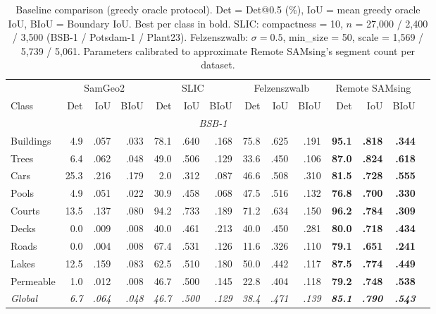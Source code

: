 \documentclass[review,11pt,authoryear]{elsarticle}
\begin{document}
\begin{table}[htbp]
\centering
\caption{Baseline comparison (greedy oracle protocol). Det = Det@0.5 (\%), IoU = mean greedy oracle IoU, BIoU = Boundary IoU. Best per class in bold. SLIC: compactness = 10, $n$ = 27{,}000 / 2{,}400 / 3{,}500 (BSB-1 / Potsdam-1 / Plant23). Felzenszwalb: $\sigma = 0.5$, min\_size = 50, scale = 1{,}569 / 5{,}739 / 5{,}061. Parameters calibrated to approximate Remote SAMsing's segment count per dataset.}
\label{tab:baselines}
\scriptsize
\begin{tabular*}{\textwidth}{@{\extracolsep{\fill}}lrrrrrrrrrrrrr}
\toprule
 & \multicolumn{3}{c}{SamGeo2} & \multicolumn{3}{c}{SLIC} & \multicolumn{3}{c}{Felzenszwalb} & \multicolumn{3}{c}{Remote SAMsing} \\
\cmidrule(lr){2-4} \cmidrule(lr){5-7} \cmidrule(lr){8-10} \cmidrule(lr){11-13}
Class & Det & IoU & BIoU & Det & IoU & BIoU & Det & IoU & BIoU & Det & IoU & BIoU \\
\midrule
\multicolumn{13}{c}{\footnotesize\textit{BSB-1}} \\
\midrule
Buildings &  4.9 & .057 & .033 & 78.1 & .640 & .168 & 75.8 & .625 & .191 & \textbf{95.1} & \textbf{.818} & \textbf{.344} \\
Trees     &  6.4 & .062 & .048 & 49.0 & .506 & .129 & 33.6 & .450 & .106 & \textbf{87.0} & \textbf{.824} & \textbf{.618} \\
Cars      & 25.3 & .216 & .179 &  2.0 & .312 & .087 & 46.6 & .508 & .310 & \textbf{81.5} & \textbf{.728} & \textbf{.555} \\
Pools     &  4.9 & .051 & .022 & 30.9 & .458 & .068 & 47.5 & .516 & .132 & \textbf{76.8} & \textbf{.700} & \textbf{.330} \\
Courts    & 13.5 & .137 & .080 & 94.2 & .733 & .189 & 71.2 & .634 & .150 & \textbf{96.2} & \textbf{.784} & \textbf{.309} \\
Decks     &  0.0 & .009 & .008 & 40.0 & .461 & .213 & 40.0 & .450 & .281 & \textbf{80.0} & \textbf{.718} & \textbf{.434} \\
Roads     &  0.0 & .004 & .008 & 67.4 & .531 & .126 & 11.6 & .326 & .110 & \textbf{79.1} & \textbf{.651} & \textbf{.241} \\
Lakes     & 12.5 & .159 & .083 & 62.5 & .510 & .180 & 50.0 & .442 & .117 & \textbf{87.5} & \textbf{.774} & \textbf{.449} \\
Permeable &  1.0 & .012 & .008 & 46.7 & .500 & .145 & 22.8 & .404 & .118 & \textbf{79.2} & \textbf{.748} & \textbf{.538} \\
\textit{Global} & \textit{6.7} & \textit{.064} & \textit{.048} & \textit{46.7} & \textit{.500} & \textit{.129} & \textit{38.4} & \textit{.471} & \textit{.139} & \textit{\textbf{85.1}} & \textit{\textbf{.790}} & \textit{\textbf{.543}} \\

\end{tabular*}
\end{table}
\end{document}
